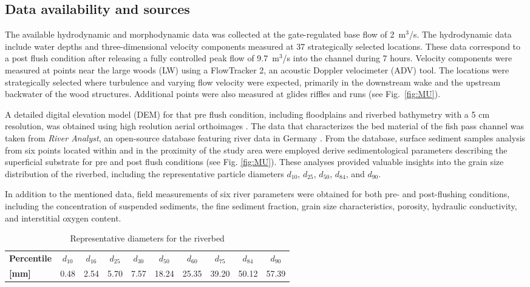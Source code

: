 \documentclass[draft,linenumbers,onecolumn]{agujournal2019} %
\begin{document}
\subsection{Data availability and sources}
\label{sec:Sec2.2}
The available hydrodynamic and morphodynamic data was collected at the gate-regulated base flow of 2~m$^3$/s. 
The hydrodynamic data include water depths and three-dimensional velocity components measured at 37 strategically selected locations. 
These data correspond to a post flush condition after releasing a fully controlled peak flow of 9.7~m$^3$/s into the channel during 7 hours. 
Velocity components were measured at points near the large woods (LW) using a FlowTracker 2, an acoustic Doppler velocimeter (ADV) tool. 
The locations were strategically selected where turbulence and varying flow velocity were expected, primarily in the downstream wake and the upstream backwater of the wood structures. Additional points were also measured at glides riffles and runs (see Fig.~\ref{fig:MU}). 

A detailed digital elevation model (DEM) for that pre flush condition, including floodplains and riverbed bathymetry with a 5 cm resolution, was obtained using high reolution aerial orthoimages \cite{schwindt2023fuzzylogic}. The data that characterizes the bed material of the fish pass channel was taken from \textit{River Analyst}, an open-source database featuring river data in Germany \cite{negreiros2023database}. From the database, surface sediment samples analysis from six points located within and in the proximity of the study area were employed derive sedimentological parameters describing the superficial substrate for pre and post flush conditions  (see Fig. \ref{fig:MU}). These analyses provided valuable insights into the grain size distribution of the riverbed, including the representative particle diameters $d_{10}$, $d_{25}$, $d_{50}$, $d_{84}$, and $d_{90}$.


In addition to the mentioned data, field measurements of six river parameters were obtained for both pre- and post-flushing conditions, including the concentration of suspended sediments, the fine sediment fraction, grain size characteristics, porosity, hydraulic conductivity, and interstitial oxygen content. 

\begin{table}[ht]
	\centering
	\caption{Representative diameters for the riverbed}
	\begin{tabular}{lccccccccc}
		\hline
		\textbf{Percentile} & $d_{10}$ & $d_{16}$ & $d_{25}$ & $d_{30}$ & $d_{50}$ & $d_{60}$ & $d_{75}$ & $d_{84}$ & $d_{90}$ \\
		\textbf{[mm]}       & 0.48      & 2.54      & 5.70      & 7.57      & 18.24     & 25.35     & 39.20     & 50.12     & 57.39     \\
		\hline
	\end{tabular}
	\label{tab:rep_diameters}
\end{table}
\end{document}
